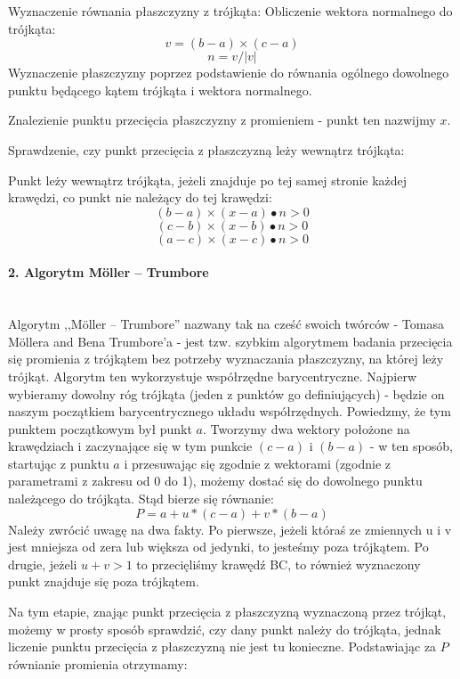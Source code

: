 \begin{outline}[enumerate]

\1 Wyznaczenie równania płaszczyzny z trójkąta:
\2 Obliczenie wektora normalnego do trójkąta:
	$$v = (b - a) \times (c - a)$$
	$$n = v/|v|$$
\2 Wyznaczenie płaszczyzny poprzez podstawienie do równania ogólnego  dowolnego punktu będącego kątem trójkąta i wektora normalnego.

\1 Znalezienie punktu przecięcia płaszczyzny z promieniem - punkt ten nazwijmy $x$.

\1 Sprawdzenie, czy punkt przecięcia z płaszczyzną leży wewnątrz trójkąta:

\2 Punkt leży wewnątrz trójkąta, jeżeli znajduje po tej samej stronie każdej krawędzi, co punkt nie należący do tej krawędzi:
$$(b - a) \times (x - a) \bullet n > 0$$
$$(c - b) \times (x - b) \bullet n > 0$$
$$(a - c) \times (x - c) \bullet n > 0$$

\end{outline}
\paragraph{2. Algorytm Möller – Trumbore}\mbox{} \\

Algorytm ,,Möller – Trumbore'' nazwany tak na cześć swoich twórców - Tomasa Möllera and Bena Trumbore'a - jest tzw. szybkim algorytmem badania przecięcia się promienia z trójkątem bez potrzeby wyznaczania płaszczyzny, na której leży trójkąt. Algorytm ten wykorzystuje współrzędne barycentryczne. Najpierw wybieramy dowolny róg trójkąta (jeden z punktów go definiujących) - będzie on naszym początkiem barycentrycznego układu współrzędnych. Powiedzmy, że tym punktem początkowym był punkt $a$. Tworzymy dwa wektory położone na krawędziach i zaczynające się w tym punkcie $(c - a)$ i $(b - a)$ - w ten sposób, startując z punktu $a$ i przesuwając się zgodnie z wektorami (zgodnie z parametrami z zakresu od 0 do 1), możemy dostać się do dowolnego punktu należącego do trójkąta. Stąd bierze się równanie:
$$P = a + u * (c - a) + v * (b - a)$$
Należy zwrócić uwagę na dwa fakty. Po pierwsze, jeżeli któraś ze zmiennych u i v jest mniejsza od zera lub większa od jedynki, to jesteśmy poza trójkątem. Po drugie, jeżeli $u + v > 1$ to przecięliśmy krawędź BC, to również wyznaczony punkt znajduje się poza trójkątem.


Na tym etapie, znając punkt przecięcia z płaszczyzną wyznaczoną przez trójkąt, możemy w prosty sposób sprawdzić, czy dany punkt należy do trójkąta, jednak liczenie punktu przecięcia z płaszczyzną nie jest tu konieczne. Podstawiając za $P$ równianie promienia otrzymamy:

